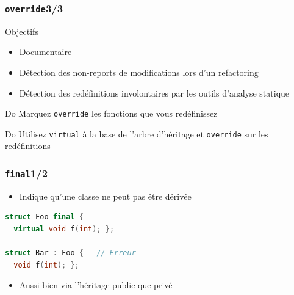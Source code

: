 \documentclass[C++.tex]{subfiles}
\begin{document}
\begin{frame}[fragile]
	\frametitle{\lstinline|override|\titlehfill{}3/3}
	\begin{block}{Objectifs}
		\begin{itemize}
			\item Documentaire
			\item Détection des non-reports de modifications lors d'un refactoring
			\item Détection des redéfinitions involontaires par les outils d'analyse statique
		\end{itemize}
	\end{block}

	\begin{exampleblock}{Do}
		Marquez \lstinline|override| les fonctions que vous redéfinissez
	\end{exampleblock}

	\begin{exampleblock}{Do}
		Utilisez \lstinline|virtual| à la base de l'arbre d'héritage et \lstinline|override| sur les redéfinitions

	\end{exampleblock}
\end{frame}

\begin{frame}[fragile]
	\frametitle{\lstinline|final|\titlehfill{}1/2}
	\begin{itemize}
		\item Indique qu'une classe ne peut pas être dérivée
	\end{itemize}

	\begin{lstlisting}[language=C++]
struct Foo final {
  virtual void f(int); };

struct Bar : Foo {   // Erreur
  void f(int); };
\end{lstlisting}

	\begin{itemize}
		\item Aussi bien via l'héritage public que privé
	\end{itemize}
\end{frame}
\end{document}
